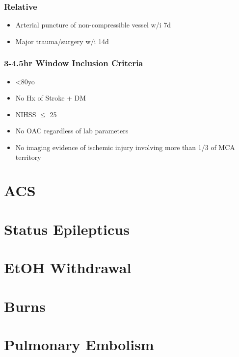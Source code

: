 \documentclass[8pt,twoside]{extarticle}
\begin{document}
\subsubsection*{Relative}
\begin{multicols}{2}
	\raggedright
\begin{itemize}[noitemsep]
	\item Arterial puncture of non-compressible vessel w/i 7d
	\item Major trauma/surgery w/i 14d
\end{itemize}
\end{multicols}

\subsubsection*{3-4.5hr Window Inclusion Criteria}
\begin{multicols}{2}
\begin{itemize}[noitemsep]
	\item \textless 80yo
	\item No Hx of Stroke + DM
	\item NIHSS $\le$ 25
	\item No OAC regardless of lab parameters
	\item No imaging evidence of ischemic injury involving more than 1/3 of MCA territory
\end{itemize}
\end{multicols}


\newpage

\section{ACS}

\newpage

\section{Status Epilepticus}

\newpage

\section{EtOH Withdrawal}

\newpage

\section{Burns}

\newpage

\section{Pulmonary Embolism}
\end{document}
